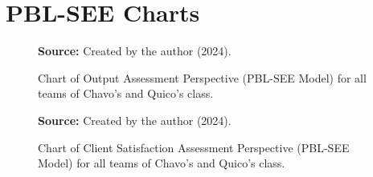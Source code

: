 \chapter{PBL-SEE Charts}
\label{chap:pbl-see-charts}

\begin{figure}[ht!]
\centering

\caption{\textmd{Chart of Output Assessment Perspective (\acrshort{PBL-SEE} Model) for all teams of Chavo's and Quico's class.}}
\label{fig:pbl-see_output}

\par\medskip\ABNTEXfontereduzida\selectfont\textbf{Source:} Created by the author (2024).
\end{figure}

\begin{figure}[ht!]
\centering

\caption{\textmd{Chart of Client Satisfaction Assessment Perspective (\acrshort{PBL-SEE} Model) for all teams of Chavo's and Quico's class.}}
\label{fig:pbl-see_client-satisfaction}

\par\medskip\ABNTEXfontereduzida\selectfont\textbf{Source:} Created by the author (2024).
\end{figure}

